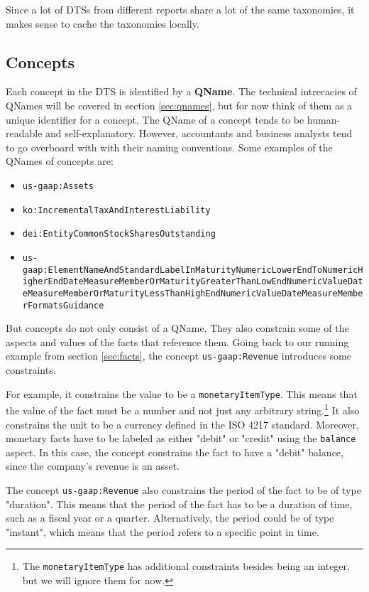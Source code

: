 Since a lot of DTSs from different reports share a lot of the same taxonomies, it makes sense to cache the taxonomies locally.

\subsection{Concepts}

Each concept in the DTS is identified by a \textbf{QName}. 
The technical intrecacies of QNames will be covered in section \ref{sec:qnames}, but for now think of them as a unique identifier for a concept.
The QName of a concept tends to be human-readable and self-explanatory. 
However, accountants and business analysts tend to go overboard with with their naming conventions.
Some examples of the QNames of concepts are:

\begin{itemize}
    \item \texttt{us-gaap:Assets}
    \item \texttt{ko:IncrementalTaxAndInterestLiability}
    \item \texttt{dei:EntityCommonStockSharesOutstanding}
    \item \texttt{us-gaap:ElementNameAndStandardLabelInMaturityNumericLowerEndToNumericHigherEndDateMeasureMemberOrMaturityGreaterThanLowEndNumericValueDateMeasureMemberOrMaturityLessThanHighEndNumericValueDateMeasureMemberFormatsGuidance}
\end{itemize}

But concepts do not only consist of a QName.
They also constrain some of the aspects and values of the facts that reference them.
Going back to our running example from section \ref{sec:facts}, the concept \texttt{us-gaap:Revenue} introduces some constraints.

For example, it constrains the value to be a \texttt{monetaryItemType}.
This means that the value of the fact must be a number and not just any arbitrary string.\footnote{The \texttt{monetaryItemType} has additional constraints besides being an integer, but we will ignore them for now.}
It also constrains the unit to be a currency defined in the ISO 4217 standard.\cite{eba2018filingrules}
Moreover, monetary facts have to be labeled as either "debit" or "credit" using the \texttt{balance} aspect.
In this case, the concept constrains the fact to have a "debit" balance, since the company's revenue is an asset.

The concept \texttt{us-gaap:Revenue} also constrains the period of the fact to be of type "duration".
This means that the period of the fact has to be a duration of time, such as a fiscal year or a quarter.
Alternatively, the period could be of type "instant", which means that the period refers to a specific point in time.

